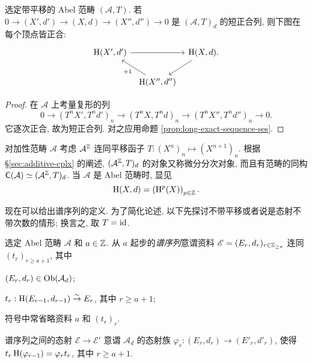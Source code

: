 \begin{lemma}\label{prop:diff-obj-triangle}
	选定带平移的 Abel 范畴 $(\mathcal{A}, T)$. 若 $0 \to (X', d') \to (X, d) \to (X'', d'') \to 0$ 是 $(\mathcal{A}, T)_d$ 的短正合列, 则下图在每个顶点皆正合:
	\[\begin{tikzcd}[column sep=tiny]
		\Hm(X', d') \arrow[rr] & & \Hm(X, d) \arrow[ld] . \\
		& \Hm(X'', d'') \arrow[lu, "{+1}"] &
	\end{tikzcd}\]
\end{lemma}
\begin{proof}
	在 $\mathcal{A}$ 上考量复形的列
	\[ 0 \to (T^n X', T^n d')_n \to (T^n X, T^n d)_n \to (T^n X'', T^n d'')_n \to 0. \]
	它逐次正合, 故为短正合列. 对之应用命题 \ref{prop:long-exact-sequence-ses}.
\end{proof}

\begin{example}[复形作为微分对象]\label{eg:cplx-as-diff}
	对加性范畴 $\mathcal{A}$ 考虑 $\mathcal{A}^{\mathbb{Z}}$ 连同平移函子 $T: (X^n)_n \mapsto (X^{n+1})_n$. 根据 \S\ref{sec:additive-cplx} 的阐述, $(\mathcal{A}^{\mathbb{Z}}, T)_d$ 的对象又称微分分次对象, 而且有范畴的同构 $\mathsf{C}(\mathcal{A}) \simeq (\mathcal{A}^{\mathbb{Z}}, T)_d$. 当 $\mathcal{A}$ 是 Abel 范畴时, 显见
	\[ \operatorname{H}(X, d) = \left( \operatorname{H}^p(X) \right)_{p \in \mathbb{Z}}. \]
\end{example}

现在可以给出谱序列的定义. 为了简化论述, 以下先探讨不带平移或者说是态射不带次数的情形; 换言之, 取 $T = \mathrm{id}$.

\begin{definition}\label{def:SS-abstract}
	选定 Abel 范畴 $\mathcal{A}$ 和 $a \in \mathbb{Z}$. 从 $a$ 起步的\emph{谱序列}意谓资料 $\mathscr{E} = (E_r, d_r)_{r \in \mathbb{Z}_{\geq a}}$ 连同 $(t_r)_{r \geq a+1}$, 其中
	\begin{compactitem}
		\item $(E_r, d_r) \in \operatorname{Ob}(\mathcal{A}_d)$;
		\item $t_r: \operatorname{H}(E_{r-1}, d_{r-1}) \stackrel{\sim}{\rightarrow} E_r$, 其中 $r \geq a+1$;
	\end{compactitem}
	符号中常省略资料 $a$ 和 $(t_r)_r$.

	谱序列之间的态射 $\mathscr{E} \to \mathscr{E}'$ 意谓 $\mathcal{A}_d$ 的态射族 $\varphi_r: (E_r, d_r) \to (E'_r, d'_r)$, 使得 $t_r \operatorname{H}(\varphi_{r-1}) = \varphi_r t_r$, 其中 $r \geq a+1$.
\end{definition}

